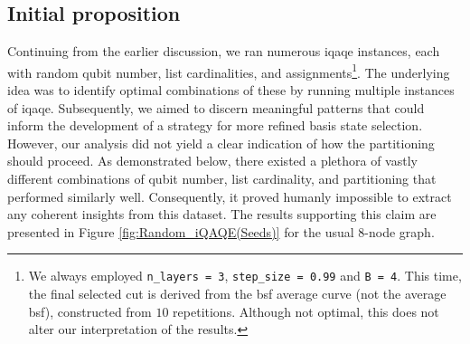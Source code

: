 \vspace{-2.5mm}
\subsection*{Initial proposition}
Continuing from the earlier discussion, we ran numerous \acrshort{iqaqe} instances, each with random qubit number, list cardinalities, and assignments\footnote{We always employed \texttt{n\_layers = 3}, \texttt{step\_size = 0.99} and \texttt{B = 4}. This time, the final selected cut is derived from the \acrshort{bsf} average curve (not the average \acrshort{bsf}), constructed from $10$ repetitions. Although not optimal, this does not alter our interpretation of the results.}. The underlying idea was to identify optimal combinations of these by running multiple instances of \acrshort{iqaqe}. Subsequently, we aimed to discern meaningful patterns that could inform the development of a strategy for more refined basis state selection. However, our analysis did not yield a clear indication of how the partitioning should proceed. As demonstrated below, there existed a plethora of vastly different combinations of qubit number, list cardinality, and partitioning that performed similarly well. Consequently, it proved humanly impossible to extract any coherent insights from this dataset. The results supporting this claim are presented in Figure \ref{fig:Random_iQAQE(Seeds)} for the usual $8$-node graph.
